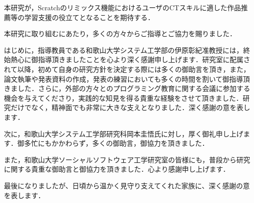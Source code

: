 \documentclass[11pt]{jreport}
\begin{document}
本研究が，Scratchのリミックス機能におけるユーザのCTスキルに適した作品推薦等の学習支援の役立てとなることを期待する．







\begin{acknowledgements}
本研究に取り組むにあたり，多くの方々からご指導とご協力を賜りました．

はじめに，指導教員である和歌山大学システム工学部の伊原彰紀准教授には，終始熱心に御指導頂きましたことを心より深く感謝申し上げます．研究室に配属されて以降，初めて自身の研究方針を決定する際には多くの御助言を頂き，また，論文執筆や発表資料の作成，発表の練習においても多くの時間を割いて御指導頂きました．さらに，外部の方々とのプログラミング教育に関する会議に参加する機会を与えてくださり，実践的な知見を得る貴重な経験をさせて頂きました．研究だけでなく，精神面でも非常に大きな支えとなりました．深く感謝の意を表します．

次に，和歌山大学システム工学部研究科岡本圭悟氏に対し，厚く御礼申し上げます．御多忙にもかかわらず，多くの御助言，御協力を頂きました．

また，和歌山大学ソーシャルソフトウェア工学研究室の皆様にも，普段から研究に関する貴重な御助言と御協力を頂きました．心より感謝申し上げます．

最後になりましたが、日頃から温かく見守り支えてくれた家族に、深く感謝の意を表します．

\end{acknowledgements}





\end{document}
